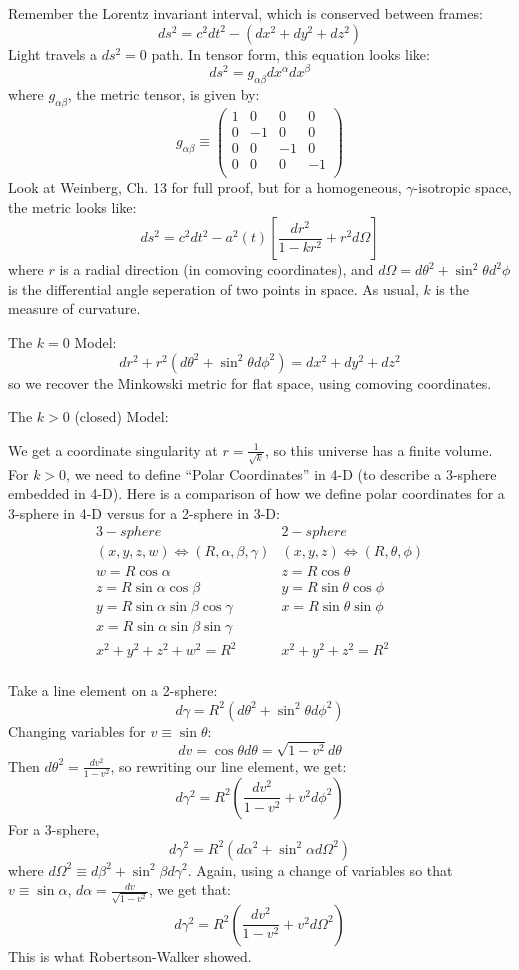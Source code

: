 \documentclass{article}
\def\iff{\Leftrightarrow}
\def\iff{\Leftrightarrow}
\begin{document}
Remember the Lorentz invariant interval, which is conserved between frames:
$$ds^2=c^2dt^2-(dx^2+dy^2+dz^2)$$
Light travels a $ds^2=0$ path.  In tensor form, this equation looks like:
$$ds^2=g_{\alpha\beta}dx^\alpha dx^\beta$$
where $g_{\alpha\beta}$, the metric tensor, is given by:
$$g_{\alpha\beta}\equiv\begin{pmatrix} 1&0&0&0\\0&-1&0&0\\0&0&-1&0\\ 0&0&0&-1\\
\end{pmatrix}$$
Look at Weinberg, Ch. 13 for full proof, but for a homogeneous, 
$\gamma$-isotropic space, the metric looks like: 
$$ds^2=c^2dt^2-a^2(t)\left[\frac{dr^2}{ 1-kr^2}+r^2d\Omega\right]$$
where $r$ is a radial direction (in
comoving coordinates), and $d\Omega=d\theta^2+\sin^2\theta d^2\phi$ is the
differential angle seperation of two points in space.  As usual,
$k$ is the measure of curvature.


The $k=0$ Model: 
$$dr^2+r^2(d\theta^2+\sin^2\theta d\phi^2)=dx^2+dy^2+dz^2$$
so we recover the Minkowski metric for flat space, using comoving coordinates.

The $k>0$ (closed) Model:\par
We get a coordinate singularity at $r=\frac{1}{\sqrt{k}}$, so this universe
has a finite volume.
For $k>0$, we need to define ``Polar Coordinates'' in 4-D (to describe a
3-sphere embedded in 4-D).  Here is a comparison of how we define polar 
coordinates for a 3-sphere in 4-D versus for a 2-sphere in 3-D:
$$\begin{matrix} 
3-sphere&2-sphere\\
(x,y,z,w)\iff (R,\alpha,\beta,\gamma)&(x,y,z)\iff(R,\theta,\phi)\\
w=R\cos\alpha&z=R\cos\theta\\
z=R\sin\alpha\cos\beta&y=R\sin\theta\cos\phi\\
y=R\sin\alpha\sin\beta\cos\gamma&x=R\sin\theta\sin\phi\\
x=R\sin\alpha\sin\beta\sin\gamma& \\
x^2+y^2+z^2+w^2=R^2&x^2+y^2+z^2=R^2\\
\end{matrix}$$

Take a line element on a 2-sphere: 
$$d\gamma=R^2(d\theta^2+\sin^2\theta d\phi^2)$$
Changing variables for $v\equiv\sin\theta$:
$$dv=\cos\theta d\theta=\sqrt{1-v^2}d\theta$$
Then $d\theta^2=\frac{dv^2}{1-v^2}$, so rewriting our line element, we get:
$$d\gamma^2=R^2\left(\frac{dv^2}{ 1-v^2}+v^2d\phi^2\right)$$
For a 3-sphere, 
$$d\gamma^2=R^2(d\alpha^2+\sin^2\alpha d\Omega^2)$$
where $d\Omega^2\equiv d\beta^2+\sin^2\beta d\gamma^2$.  Again, using a change
of variables so that $v\equiv\sin\alpha$, $d\alpha=\frac{dv}{\sqrt{1-v^2}}$,
we get that:
$$\boxed{d\gamma^2=R^2\left(\frac{dv^2}{ 1-v^2}+v^2d\Omega^2\right)}$$
This is what Robertson-Walker showed. 
\end{document}
